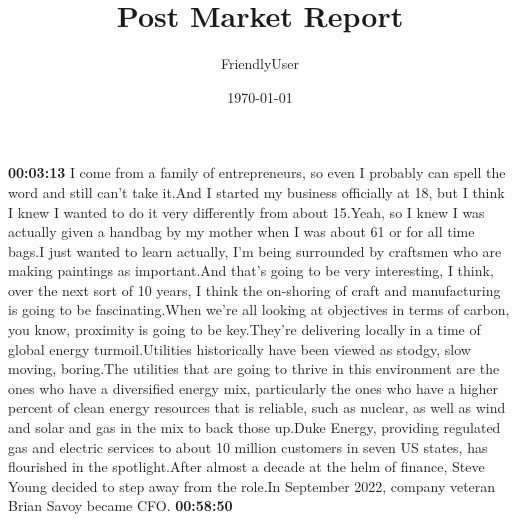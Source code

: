 \documentclass{article}%
\title{Post Market Report}%
\author{FriendlyUser}%
\date{\today}%
\begin{document}
%
\normalsize%
\textbf{00:03:13}%
\newline%
I come from a family of entrepreneurs, so even I probably can spell the word and still can't take it.And I started my business officially at 18, but I think I knew I wanted to do it very differently from about 15.Yeah, so I knew I was actually given a handbag by my mother when I was about 61 or for all time bags.I just wanted to learn actually, I'm being surrounded by craftsmen who are making paintings as important.And that's going to be very interesting, I think, over the next sort of 10 years, I think the on{-}shoring of craft and manufacturing is going to be fascinating.When we're all looking at objectives in terms of carbon, you know, proximity is going to be key.They're delivering locally in a time of global energy turmoil.Utilities historically have been viewed as stodgy, slow moving, boring.The utilities that are going to thrive in this environment are the ones who have a diversified energy mix, particularly the ones who have a higher percent of clean energy resources that is reliable, such as nuclear, as well as wind and solar and gas in the mix to back those up.Duke Energy, providing regulated gas and electric services to about 10 million customers in seven US states, has flourished in the spotlight.After almost a decade at the helm of finance, Steve Young decided to step away from the role.In September 2022, company veteran Brian Savoy became CFO.%
\textbf{00:58:50}%
\newline%
\end{document}
